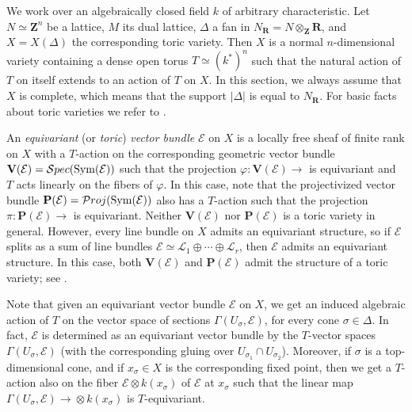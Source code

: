 \documentclass[12pt]{amsart}
\theoremstyle{definition}
\theoremstyle{remark}
\begin{document}
We work over an algebraically closed field $k$ of arbitrary
characteristic. Let $N\simeq{{\mathbf Z}}^n$ be a lattice, $M$ its dual lattice, $\Delta$ a fan in
$N_{{\mathbf R}}=N\otimes_{{\mathbf Z}}{{\mathbf R}}$, and $X=X(\Delta)$ the corresponding
toric variety. Then $X$ is a normal $n$-dimensional variety containing a dense open torus $T \simeq (k^*)^n$ such
that the natural action of $T$ on itself extends to an action of $T$
on $X$. In this section, we always assume that $X$ is complete, which means that the
support $|\Delta|$ is equal to $N_{{\mathbf R}}$. For basic facts about
toric varieties we refer to \cite{Fulton}.

An \emph{equivariant} (or \emph{toric}) \emph{vector bundle} ${\mathcal{E}}$
on $X$ is a locally free sheaf of finite rank on $X$ with a
$T$-action on the corresponding geometric vector bundle ${\mathbf
V}({\mathcal{E}})={\mathcal Spec}({\rm Sym}({\mathcal{E}}))$ such that the projection
${\varphi}\colon {\mathbf V}({\mathcal{E}}){\xrightarrow{\ \ }}$ is equivariant and $T$ acts linearly on the
fibers of ${\varphi}$. In this case, note that the projectivized vector
bundle ${{\mathbf P}}({\mathcal{E}})={\mathcal Proj}({\rm Sym}({\mathcal{E}}))$ also has a
$T$-action such that the projection $\pi\colon {{\mathbf P}}({\mathcal{E}}){\xrightarrow{\ \ }}$ is
equivariant. Neither $\mathbf V({\mathcal{E}})$ nor ${{\mathbf P}}({\mathcal{E}})$ is a toric
variety in general. However, every line bundle on $X$ admits an
equivariant structure, so if ${\mathcal{E}}$
 splits as a sum of line bundles ${\mathcal{E}}\simeq
{\mathcal{L}}_1\oplus\cdots\oplus {\mathcal{L}}_r$, then ${\mathcal{E}}$ admits an equivariant
structure. In this case, both ${\mathbf V}({\mathcal{E}})$ and ${{\mathbf P}}({\mathcal{E}})$
admit the structure of a toric variety; see \cite[pp. 58--59]{Oda}.

Note  that given an equivariant vector bundle ${\mathcal{E}}$ on
$X$, we get an induced algebraic action of $T$ on the vector space of sections
$\Gamma(U_{\sigma},{\mathcal{E}})$, for every cone $\sigma\in\Delta$. In fact,
${\mathcal{E}}$ is determined as an equivariant vector bundle by the
$T$-vector spaces $\Gamma(U_{\sigma},{\mathcal{E}})$ (with the corresponding
gluing over $U_{\sigma_1}\cap U_{\sigma_2}$). Moreover, if $\sigma$
is a top-dimensional cone, and if $x_{\sigma}\in X$ is the
corresponding fixed point, then we get a $T$-action also on the
fiber ${\mathcal{E}}\otimes k(x_{\sigma})$ of ${\mathcal{E}}$ at $x_{\sigma}$ such that
the linear map $\Gamma(U_{\sigma},{\mathcal{E}}){\xrightarrow{\ \ }}\otimes k(x_{\sigma})$
is $T$-equivariant.
\end{document}
